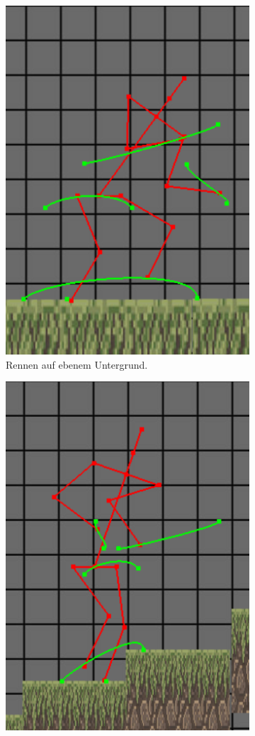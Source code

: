 \begin{figure}
\begin{subfigure}[t]{.4\linewidth}
        \includegraphics[width=0.75\linewidth]{images/even_ground_fast2.png}
        \caption{Rennen auf ebenem Untergrund.}
        \label{even_fast}
    \end{subfigure}
    \begin{subfigure}[t]{.4\linewidth}
        \centering
        \includegraphics[width=0.75\linewidth]{images/going_up3.png}

\end{subfigure}
\end{figure}
